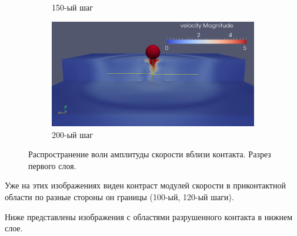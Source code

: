 \begin{figure}[H]
\begin{subfigure}[b]{0.5\textwidth}
\caption{150-ый шаг}
\end{subfigure}
\begin{subfigure}[b]{0.5\textwidth}
\centering
\includegraphics[width=1.0\textwidth]{png/delamination/velocity/200.png}
\caption{200-ый шаг}
\end{subfigure}
\caption{Распространение волн амплитуды скорости вблизи контакта. Разрез первого слоя.}
\label{pic:delamination_velocity}
\end{figure}

	Уже на этих изображениях виден контраст модулей скорости в приконтактной области по разные стороны он границы (100-ый, 120-ый шаги).
	
	Ниже представлены изображения с областями разрушенного контакта в нижнем слое.
	

